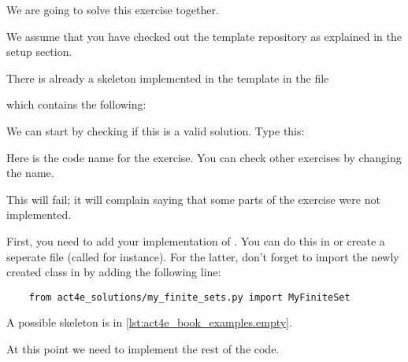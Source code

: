 We are going to solve this exercise together.

We assume that you have checked out the template repository as explained in the setup section.

There is already a skeleton implemented in the template in the file


which contains the following:

\begin{longcode}
    \caption{}

    \label{lst:act4e_book_examples.initial}
\end{longcode}

We can start by checking if this is a valid solution.
Type this:


Here  is the code name for the exercise.
You can check other exercises by changing the name.

This will fail; it will complain saying that some parts of the exercise were not implemented.


First, you need to add your implementation of . You can do this in  or create a seperate file (called  for instance). 
For the latter, don't forget to import the newly created class in  by adding the following line:
\begin{verbatim}
    from act4e_solutions/my_finite_sets.py import MyFiniteSet
\end{verbatim}
A possible skeleton is in \cref{lst:act4e_book_examples.empty}.

\begin{longcode}
    \caption{}

    \label{lst:act4e_book_examples.empty}
\end{longcode}

At this point we need to implement the rest of the code.

